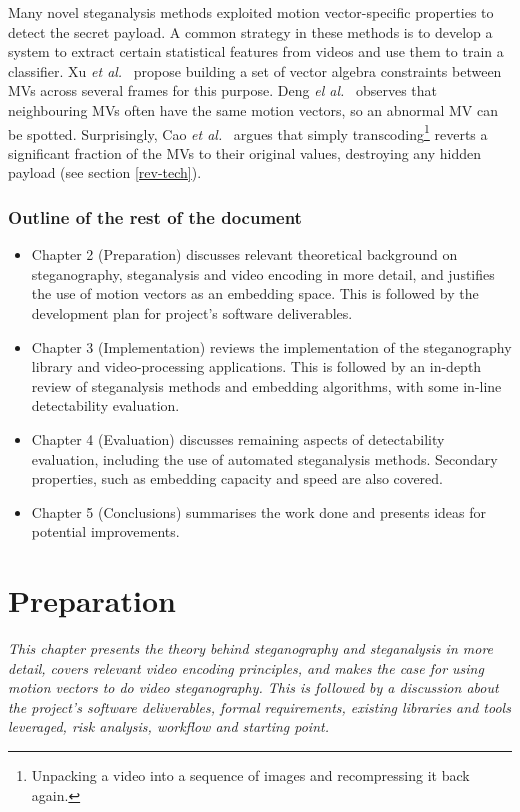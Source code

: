 \documentclass[12pt,british,twoside,notitlepage,usenames,dvipsnames,hypens,final]{report}
\numberwithin{equation}{section}
\numberwithin{figure}{section}
\begin{document}
Many novel steganalysis methods exploited motion vector-specific properties to detect the secret payload. A common strategy in these methods is to develop a system to extract certain statistical features from videos and use them to train a classifier. Xu \emph{et al.}~\cite{xu2013video} propose building a set of vector algebra constraints between MVs across several frames for this purpose. Deng \emph{el al.}~\cite{deng2012digital} observes that neighbouring MVs often have the same motion vectors, so an abnormal MV can be spotted. Surprisingly, Cao \emph{et al.}~\cite{cao2012video} argues that simply transcoding\footnote{Unpacking a video into a sequence of images and recompressing it back again.} reverts a significant fraction of the MVs to their original values, destroying any hidden payload (see section \ref{rev-tech}).

\subsection*{Outline of the rest of the document}
\begin{itemize}
\item Chapter 2 (Preparation) discusses relevant theoretical background on steganography, steganalysis and video encoding in more detail, and justifies the use of motion vectors as an embedding space. This is followed by the development plan for project's software deliverables. 
\item Chapter 3 (Implementation) reviews the implementation of the steganography library and video-processing applications. This is followed by an in-depth review of steganalysis methods and embedding algorithms, with some in-line detectability evaluation.
\item Chapter 4 (Evaluation) discusses remaining aspects of detectability evaluation, including the use of automated steganalysis methods. Secondary properties, such as embedding capacity and speed are also covered.
\item Chapter 5 (Conclusions) summarises the work done and presents ideas for potential improvements.
\end{itemize}

\cleardoublepage
\chapter{Preparation}

\textit{This chapter presents the theory behind steganography and steganalysis in more detail, covers relevant video encoding principles, and makes the case for using motion vectors to do video steganography. This is followed by a discussion about the project's software deliverables, formal requirements, existing libraries and tools leveraged, risk analysis, workflow and starting point.}
\end{document}
